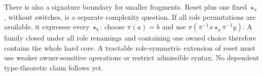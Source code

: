 \documentclass[11pt]{article}
\begin{document}
There is also a signature boundary for smaller fragments. Reset plus
one fixed $\star_a$, without switches, is a separate complexity question.
If all role permutations are available, it expresses every $\star_b$:
choose $\pi(a)=b$ and use
$\pi(\pi^{-1}x\star_a\pi^{-1}y)$. A family closed under all role
renamings and containing one owned choice therefore contains the whole
hard core. A tractable role-symmetric extension of reset must use weaker
owner-sensitive operations or restrict admissible syntax. No dependent
type-theoretic claim follows yet.



\end{document}
